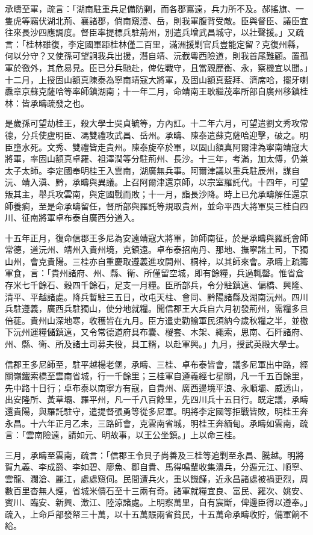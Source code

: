 \begin{pinyinscope}
承疇至軍，疏言：「湖南駐重兵足備防剿，而各郡窵遠，兵力所不及。郝搖旗、一隻虎等竊伏湖北荊、襄諸郡，倘南窺澧、岳，則我軍腹背受敵。臣與督臣、議臣宜往來長沙四應調度。督臣率提標兵駐荊州，別遣兵增武昌城守，以壯聲援。」又疏言：「桂林雖復，李定國軍距桂林僅二百里，滿洲援剿官兵豈能定留？克復州縣，何以分守？又使孫可望詗我兵出援，潛自靖、沅截粵西險道，則我首尾難顧。置孤軍於徼外，其危易見。臣已分兵馳赴，俾佐戰守，且當親歷衡、永，察機宜以聞。」十二月，上授固山額真陳泰為寧南靖寇大將軍，及固山額真藍拜、濟席哈，擺牙喇纛章京蘇克薩哈等率師鎮湖南；十一年二月，命靖南王耿繼茂率所部自廣州移鎮桂林：皆承疇疏發之也。

是歲孫可望劫桂王，殺大學士吳貞毓等，方內訌。十二年六月，可望遣劉文秀攻常德，分兵使盧明臣、馮雙禮攻武昌、岳州。承疇、陳泰遣蘇克薩哈迎擊，破之。明臣墮水死。文秀、雙禮皆走貴州。陳泰旋卒於軍，以固山額真阿爾津為寧南靖寇大將軍，率固山額真卓羅、祖澤潤等分駐荊州、長沙。十三年，考滿，加太傅，仍兼太子太師。李定國奉明桂王入雲南，湖廣無兵事。阿爾津議以重兵駐辰州，謀自沅、靖入滇、黔，承疇與異議。上召阿爾津還京師，以宗室羅託代。十四年，可望叛其主，舉兵攻雲南，與定國戰而敗；十一月，詣長沙降。時上已允承疇解任還京師養痾，至是命承疇留任，督所部與羅託等規取貴州，並命平西大將軍吳三桂自四川、征南將軍卓布泰自廣西分道入。

十五年正月，復命信郡王多尼為安遠靖寇大將軍，帥師南征，於是承疇與羅託會師常德，道沅州、靖州入貴州境，克鎮遠。卓布泰招南丹、那地、撫寧諸土司，下獨山州，會克貴陽。三桂亦自重慶取遵義進攻開州、桐梓，以其師來會。承疇上疏籌軍食，言：「貴州諸府、州、縣、衛、所僅留空城，即有餘糧，兵過輒罄。惟省倉存米七千餘石、穀四千餘石，足支一月糧。臣所部兵，令分駐鎮遠、偏橋、興隆、清平、平越諸處。降兵暫駐三五日，改屯天柱、會同、黔陽諸縣及湖南沅州。四川兵駐遵義，廣西兵駐獨山，使分地就糧。聞信郡王大兵自六月初發荊州，需糧多且倍蓰。貴州山深地寒，收穫皆在九月。臣方遣吏勸諭軍民須納今歲秋糧之半，並檄下沅州運糧儲鎮遠，又令常德道府具布囊、椶套、木架、繩索，思南、石阡諸府、州、縣、衛、所及諸土司募夫役，具工糈，以赴軍興。」九月，授武英殿大學士。

信郡王多尼師至，駐平越楊老堡，承疇、三桂、卓布泰皆會，議多尼軍出中路，經關嶺鐵索橋至雲南省城，行一千餘里；三桂軍自遵義經七星關，凡一千五百餘里，先中路十日行；卓布泰以南寧方有寇，自貴州、廣西邊境平浪、永順壩、威透山，出安隆所、黃草壩、羅平州，凡一千八百餘里，先四川兵十五日行。既定議，承疇還貴陽，與羅託駐守，遣提督張勇等從多尼軍。明將李定國等拒戰皆敗，明桂王奔永昌。十六年正月乙未，三路師會，克雲南省城，明桂王奔緬甸。承疇如雲南，疏言：「雲南險遠，請如元、明故事，以王公坐鎮。」上以命三桂。

三月，承疇至雲南，疏言：「信郡王令貝子尚善及三桂等追剿至永昌、騰越。明將賀九義、李成爵、李如碧、廖魚、鄒自貴、馬得鳴輩收集潰兵，分遁元江、順寧、雲龍、瀾滄、麗江，處處窺伺。民間遭兵火，重以饑饉，近永昌諸處被禍更烈，周數百里杳無人煙，省城米價石至十三兩有奇。諸軍就糧宜良、富民、羅次、姚安、賓川、臨安、新興、澂江、陸涼諸處。上明察萬里，自有宸斷，俾邊臣得以遵奉。」疏入，上命戶部發帑三十萬，以十五萬賑兩省貧民，十五萬命承疇收貯，備軍餉不給。


\end{pinyinscope}
